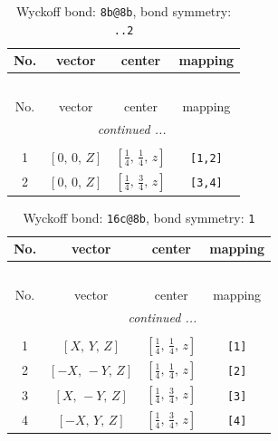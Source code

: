\documentclass[fleqn,8pt]{jsarticle}
\begin{document}
\renewcommand{\arraystretch}{1.2}
\begin{longtable}{cccc}
\caption{Wyckoff bond: {\tt 8b@8b}, bond symmetry: {\tt ..2}}
 \\
 \hline \hline
No. & vector & center & mapping \\ \hline \endfirsthead

\multicolumn{3}{l}{\tablename\ \thetable{}} \\
 \hline \hline
No. & vector & center & mapping \\ \hline \endhead

 \hline \hline
\multicolumn{3}{r}{\footnotesize\it continued ...} \\ \endfoot

 \hline \hline
\multicolumn{3}{r}{} \\ \endlastfoot

1 & $\left[ 0,\, 0,\, Z \right]$ & $\left[ \frac{1}{4},\, \frac{1}{4},\, z \right]$ & {\tt [1,2]} \\ \hline
2 & $\left[ 0,\, 0,\, Z \right]$ & $\left[ \frac{1}{4},\, \frac{3}{4},\, z \right]$ & {\tt [3,4]} \\
\end{longtable}
\renewcommand{\arraystretch}{1.2}
\begin{longtable}{cccc}
\caption{Wyckoff bond: {\tt 16c@8b}, bond symmetry: {\tt 1}}
 \\
 \hline \hline
No. & vector & center & mapping \\ \hline \endfirsthead

\multicolumn{3}{l}{\tablename\ \thetable{}} \\
 \hline \hline
No. & vector & center & mapping \\ \hline \endhead

 \hline \hline
\multicolumn{3}{r}{\footnotesize\it continued ...} \\ \endfoot

 \hline \hline
\multicolumn{3}{r}{} \\ \endlastfoot

1 & $\left[ X,\, Y,\, Z \right]$ & $\left[ \frac{1}{4},\, \frac{1}{4},\, z \right]$ & {\tt [1]} \\ \hline
2 & $\left[ - X,\, - Y,\, Z \right]$ & $\left[ \frac{1}{4},\, \frac{1}{4},\, z \right]$ & {\tt [2]} \\ \hline
3 & $\left[ X,\, - Y,\, Z \right]$ & $\left[ \frac{1}{4},\, \frac{3}{4},\, z \right]$ & {\tt [3]} \\ \hline
4 & $\left[ - X,\, Y,\, Z \right]$ & $\left[ \frac{1}{4},\, \frac{3}{4},\, z \right]$ & {\tt [4]} \\
\end{longtable}
\end{document}
